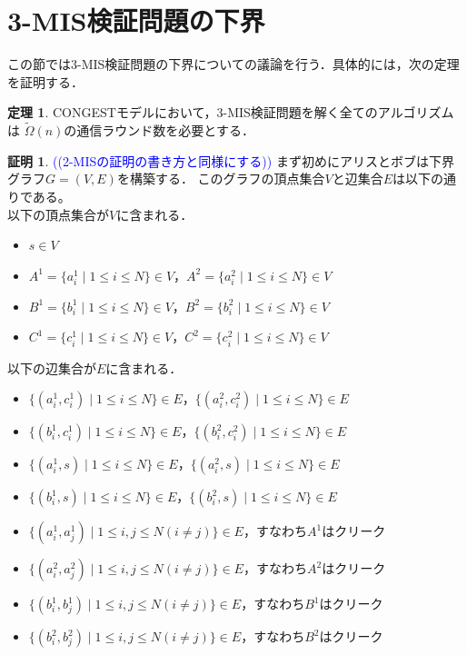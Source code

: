 \documentclass[12pt]{thesis}
\newcommand{\Izumi}[1]{\textcolor{blue}{(#1)}}
\newcommand{\CONGEST}{\textsf{CONGEST}}
\theoremstyle{definition}
\newtheorem{theorem}{定理}[chapter]
\newtheorem*{prf*}{証明}
\begin{document}
\section{3-MIS検証問題の下界}
この節では3-MIS検証問題の下界についての議論を行う．具体的には，次の定理を証明する．
\begin{theorem}
{\CONGEST}モデルにおいて，3-MIS検証問題を解く全てのアルゴリズムは
$\tilde{\Omega} (n)$の通信ラウンド数を必要とする．
\end{theorem}
\begin{prf*}
\Izumi{(2-MISの証明の書き方と同様にする)}
まず初めにアリスとボブは下界グラフ$G = (V, E)$を構築する．
このグラフの頂点集合$V$と辺集合$E$は以下の通りである。 \\
以下の頂点集合が$V$に含まれる．
\begin{itemize}
\item $s \in V$
\item $A^{1} = \{a^{1}_{i} \mid 1\leq i \leq N\}  \in V$，$A^{2} = \{a^{2}_{i} \mid 1\leq i \leq N\} \in V$
\item $B^{1} = \{b^{1}_{i} \mid 1\leq i \leq N\}  \in V$，$B^{2} = \{b^{2}_{i} \mid 1\leq i \leq N\} \in V$
\item $C^{1} = \{c^{1}_{i} \mid 1\leq i \leq N\}  \in V$，$C^{2} = \{c^{2}_{i} \mid 1\leq i \leq N\} \in V$
\end{itemize}
以下の辺集合が$E$に含まれる．
\begin{itemize}
\item $\{(a^{1}_{i}, c^{1}_{i}) \mid 1\leq i \leq N\} \in E$，$\{(a^{2}_{i}, c^{2}_{i}) \mid 1\leq i \leq N\} \in E$
\item $\{(b^{1}_{i}, c^{1}_{i}) \mid 1\leq i \leq N\} \in E$，$\{(b^{2}_{i}, c^{2}_{i}) \mid 1\leq i \leq N\} \in E$
\item $\{(a^{1}_{i}, s) \mid 1\leq i \leq N\} \in E$，$\{(a^{2}_{i}, s) \mid 1\leq i \leq N\} \in E$
\item $\{(b^{1}_{i}, s) \mid 1\leq i \leq N\} \in E$，$\{(b^{2}_{i}, s) \mid 1\leq i \leq N\} \in E$
\item $\{(a^{1}_{i}, a^{1}_{j}) \mid 1\leq i,j \leq N(i \neq j)\} \in E$，すなわち$A^{1}$はクリーク
\item $\{(a^{2}_{i}, a^{2}_{j}) \mid 1\leq i,j \leq N(i \neq j)\} \in E$，すなわち$A^{2}$はクリーク
\item $\{(b^{1}_{i}, b^{1}_{j}) \mid 1\leq i,j \leq N(i \neq j)\} \in E$，すなわち$B^{1}$はクリーク
\item $\{(b^{2}_{i}, b^{2}_{j}) \mid 1\leq i,j \leq N(i \neq j)\} \in E$，すなわち$B^{2}$はクリーク

\end{itemize}
\end{prf*}
\end{document}

